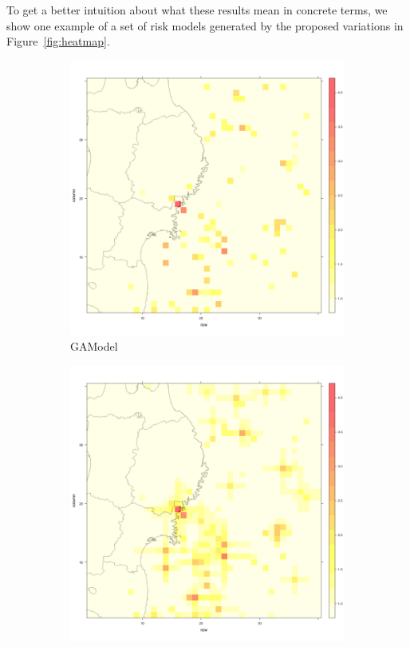 
To get a better intuition about what these results mean in concrete
terms, we show one example of a set of risk models generated by the
proposed variations in Figure~\ref{fig:heatmap}.

\begin{figure}
\centering
\begin{subfigure}{.5\textwidth}
  \centering
  \includegraphics[width=1\linewidth]{img/gaModel}
  \caption{GAModel}
  \label{fig:sub1}
\end{subfigure}%
\begin{subfigure}{.5\textwidth}
  \centering
  \includegraphics[width=1\linewidth]{img/SC-EMP-ga}

\end{subfigure}
\end{figure}
